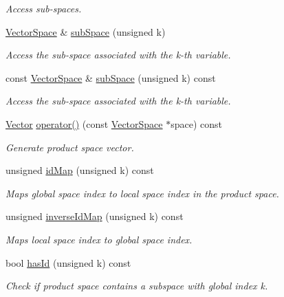 \begin{DoxyCompactItemize}
\begin{DoxyCompactList}\small\item\em \-Access sub-\/spaces. \end{DoxyCompactList}\item 
\hyperlink{classSpacy_1_1VectorSpace}{\-Vector\-Space} \& \hyperlink{classSpacy_1_1ProductSpace_1_1VectorCreator_aa61f9413eb3537879a92823dfdd0d6da}{sub\-Space} (unsigned k)
\begin{DoxyCompactList}\small\item\em \-Access the sub-\/space associated with the k-\/th variable. \end{DoxyCompactList}\item 
const \hyperlink{classSpacy_1_1VectorSpace}{\-Vector\-Space} \& \hyperlink{classSpacy_1_1ProductSpace_1_1VectorCreator_a4a74b3d51f41ba2ec1c6e755c520a5cc}{sub\-Space} (unsigned k) const 
\begin{DoxyCompactList}\small\item\em \-Access the sub-\/space associated with the k-\/th variable. \end{DoxyCompactList}\item 
\hyperlink{classSpacy_1_1ProductSpace_1_1Vector}{\-Vector} \hyperlink{classSpacy_1_1ProductSpace_1_1VectorCreator_a733adf12a3b60abc8b93b8a1476c5e8a}{operator()} (const \hyperlink{classSpacy_1_1VectorSpace}{\-Vector\-Space} $\ast$space) const 
\begin{DoxyCompactList}\small\item\em \-Generate product space vector. \end{DoxyCompactList}\item 
unsigned \hyperlink{classSpacy_1_1ProductSpace_1_1VectorCreator_a9995b95ffd41f3a5281d8db28e95e2d8}{id\-Map} (unsigned k) const 
\begin{DoxyCompactList}\small\item\em \-Maps global space index to local space index in the product space. \end{DoxyCompactList}\item 
unsigned \hyperlink{classSpacy_1_1ProductSpace_1_1VectorCreator_abfd2a000f770f0511dc864c43233a534}{inverse\-Id\-Map} (unsigned k) const 
\begin{DoxyCompactList}\small\item\em \-Maps local space index to global space index. \end{DoxyCompactList}\item 
\hypertarget{classSpacy_1_1ProductSpace_1_1VectorCreator_af548ea11a6e7f6a5c0cb78bfa7895f4a}{bool \hyperlink{classSpacy_1_1ProductSpace_1_1VectorCreator_af548ea11a6e7f6a5c0cb78bfa7895f4a}{has\-Id} (unsigned k) const }\label{classSpacy_1_1ProductSpace_1_1VectorCreator_af548ea11a6e7f6a5c0cb78bfa7895f4a}

\begin{DoxyCompactList}\small\item\em \-Check if product space contains a subspace with global index k. \end{DoxyCompactList}\end{DoxyCompactItemize}


